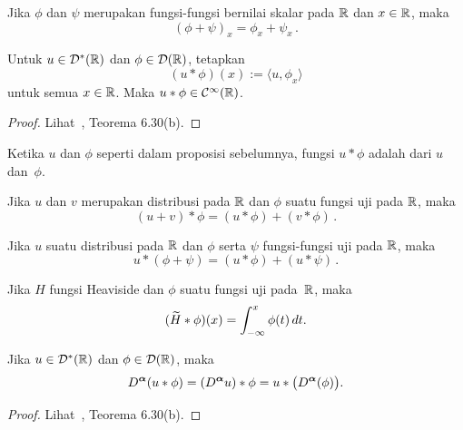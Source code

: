 \begin{prop} Jika $\phi$ dan $\psi$ merupakan fungsi-fungsi bernilai skalar pada $\mathbb{R}$ dan $x \in \mathbb{R}$, maka
   \[ (\phi + \psi)_x = \phi_x + \psi_x\,. \]
\end{prop}

\begin{prop}\label{prop_convol_distr1} Untuk $u \in \mathcal{D}^*(\mathbb{R})$ dan $\phi \in \mathcal{D}(\mathbb{R})$,
tetapkan
   \[ (u \ast \phi)(x) := \langle u,\phi_x \rangle \]
untuk semua $x \in \mathbb{R}$. Maka $u \ast \phi \in \mathcal{C}^\infty(\mathbb{R})$.
\end{prop}

\begin{proof} Lihat~\cite{Rudin:1991}, Teorema 6.30(b).  \ns
\end{proof}

\begin{defn} Ketika $u$ dan $\phi$ seperti dalam proposisi sebelumnya, fungsi $u \ast \phi$ adalah
 dari $u$ dan~$\phi$.
\end{defn}

\begin{prop} Jika $u$ dan $v$ merupakan distribusi pada $\mathbb{R}$ dan $\phi$ suatu fungsi uji pada $\mathbb{R}$, maka
   \[ (u + v) \ast \phi = (u \ast \phi) + (v \ast \phi)\,. \]
\end{prop}

\begin{prop} Jika $u$ suatu distribusi pada $\mathbb{R}$ dan $\phi$ serta $\psi$ fungsi-fungsi uji pada $\mathbb{R}$, maka
   \[ u \ast (\phi + \psi) = (u \ast \phi) + (u \ast \psi)\,. \]
\end{prop}

\begin{exam} Jika $H$ fungsi Heaviside dan $\phi$ suatu fungsi uji pada~$\mathbb{R}$, maka
   \[ (\widetilde{H} \ast \phi)(x) = \int_{-\infty}^x \phi(t)\,dt. \]
\end{exam}

\begin{prop}\label{prop_convol_distr2} Jika $u \in \mathcal{D}^*(\mathbb{R})$ dan $\phi \in \mathcal{D}(\mathbb{R})$, maka
   \[ D^{\boldsymbol{\alpha}}(u \ast \phi) = (D^{\boldsymbol{\alpha}}u) \ast \phi = u \ast \bigl(D^{\boldsymbol{\alpha}}(\phi)\bigr). \]
\end{prop}

\begin{proof} Lihat~\cite{Rudin:1991}, Teorema 6.30(b).  \ns
\end{proof}

